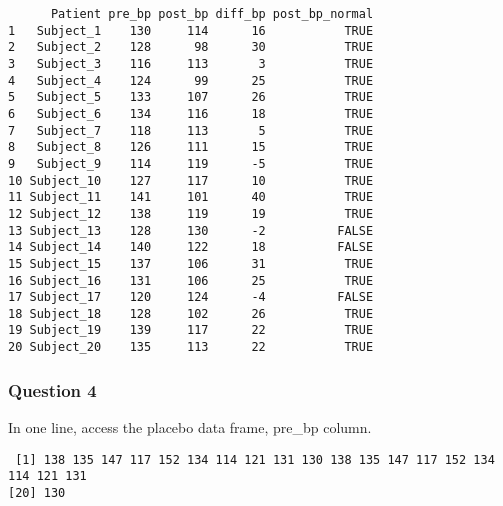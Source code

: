 \documentclass[
  letterpaper,
  DIV=11,
  numbers=noendperiod]{scrartcl}
\newenvironment{Shaded}{\begin{snugshade}}{\end{snugshade}}
\newcommand{\CommentTok}[1]{\textcolor[rgb]{0.37,0.37,0.37}{#1}}
\newcommand{\NormalTok}[1]{\textcolor[rgb]{0.00,0.23,0.31}{#1}}
\newcommand{\SpecialCharTok}[1]{\textcolor[rgb]{0.37,0.37,0.37}{#1}}
\begin{document}
\begin{Shaded}
\end{Shaded}

\begin{verbatim}
      Patient pre_bp post_bp diff_bp post_bp_normal
1   Subject_1    130     114      16           TRUE
2   Subject_2    128      98      30           TRUE
3   Subject_3    116     113       3           TRUE
4   Subject_4    124      99      25           TRUE
5   Subject_5    133     107      26           TRUE
6   Subject_6    134     116      18           TRUE
7   Subject_7    118     113       5           TRUE
8   Subject_8    126     111      15           TRUE
9   Subject_9    114     119      -5           TRUE
10 Subject_10    127     117      10           TRUE
11 Subject_11    141     101      40           TRUE
12 Subject_12    138     119      19           TRUE
13 Subject_13    128     130      -2          FALSE
14 Subject_14    140     122      18          FALSE
15 Subject_15    137     106      31           TRUE
16 Subject_16    131     106      25           TRUE
17 Subject_17    120     124      -4          FALSE
18 Subject_18    128     102      26           TRUE
19 Subject_19    139     117      22           TRUE
20 Subject_20    135     113      22           TRUE
\end{verbatim}

\subsubsection{Question 4}\label{question-4-2}

In one line, access the placebo data frame, pre\_bp column.

\begin{Shaded}
\end{Shaded}

\begin{verbatim}
 [1] 138 135 147 117 152 134 114 121 131 130 138 135 147 117 152 134 114 121 131
[20] 130
\end{verbatim}
\end{document}

